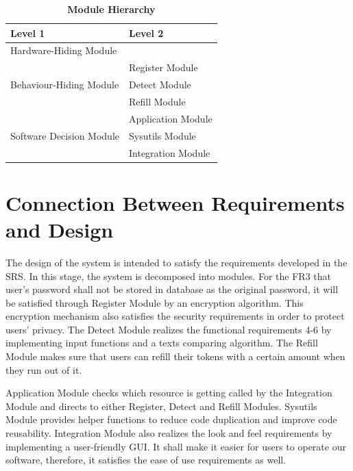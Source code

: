 \documentclass[12pt, titlepage]{article}
\begin{document}
\begin{table}[h!]
\centering
\begin{tabular}{p{} p{}}
\toprule
\textbf{Level 1} & \textbf{Level 2}\\
\midrule

{Hardware-Hiding Module} & ~ \\
\midrule

\multirow{3}{0.3\textwidth}{Behaviour-Hiding Module} & Register Module\\
& Detect Module\\
& Refill Module\\

\midrule

\multirow{3}{0.3\textwidth}{Software Decision Module} 
& Application Module\\
& Sysutils Module\\
& Integration Module\\
\bottomrule

\end{tabular}
\caption{\bf Module Hierarchy}
\label{TblMH}
\end{table}

\section{Connection Between Requirements and Design} \label{SecConnection}

The design of the system is intended to satisfy the requirements developed in
the SRS. In this stage, the system is decomposed into modules. For the FR3 that user's password shall not be stored in database as the original password, it will be satisfied through Register Module by an encryption algorithm. This encryption mechanism also satisfies the security requirements in order to protect users' privacy. The Detect Module realizes the functional requirements 4-6 by implementing input functions and a texts comparing algorithm. The Refill Module makes sure that users can refill their tokens with a certain amount when they run out of it. 

Application Module checks which resource is getting called by the Integration Module and directs to either Register, Detect and Refill Modules. Sysutils Module provides helper functions to reduce code duplication and improve code reusability. Integration Module also realizes the look and feel requirements by implementing a user-friendly GUI. It shall make it easier for users to operate our software, therefore, it satisfies the ease of use requirements as well.
\end{document}
